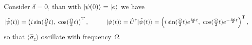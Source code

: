 Consider $\delta=0$, than with $\left| \psi(0) \right\rangle = \left| e \right\rangle$ we have
\begin{equation*}
	|\tilde{\psi}(t) \rangle = \left(i \sin(\tfrac{\Omega}{2}t),\ \cos(\tfrac{\Omega}{2}t)\right)\T,
	\hspace{10 mm} 
	\ket{\psi(t)} = \hat{U}\D |\tilde{\psi}(t) \rangle = \left(i \sin(\tfrac{\Omega}{2}t) e^{\frac{i \omega}{2} t },\ \cos(\tfrac{\Omega}{2}t)e^{-\frac{i \omega}{2} t  }\right)\T,
\end{equation*}
so that $\langle \hat{\sigma}_z\rangle$ oscillate with frequency $\Omega$.

